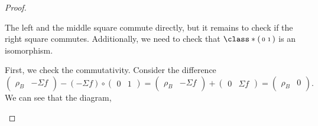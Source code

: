 \begin{proof}
\begin{enumerate}[label={(\bfseries TR\arabic*)}]
{\begin{center}
            \end{center}
            The left and the middle square commute directly, but it remains to check if the right square commutes. Additionally, we need to check that \( \class*{
                \begin{psmallmatrix}
                    0 & 1
                \end{psmallmatrix}
            } \) is an isomorphism.

            First, we check the commutativity. Consider the difference
            \[
                \begin{pmatrix}
                    \rho_B & -\Sigma f
                \end{pmatrix}
                -
                (-\Sigma f) \circ
                \begin{pmatrix}
                    0 & 1
                \end{pmatrix}
                =
                \begin{pmatrix}
                    \rho_B & -\Sigma f
                \end{pmatrix}
                +
                \begin{pmatrix}
                    0 & \Sigma f
                \end{pmatrix}
                =
                \begin{pmatrix}
                    \rho_B & 0
                \end{pmatrix}.
            \]
            We can see that the diagram,
            \begin{center}
\end{center}}
\end{enumerate}
\end{proof}
